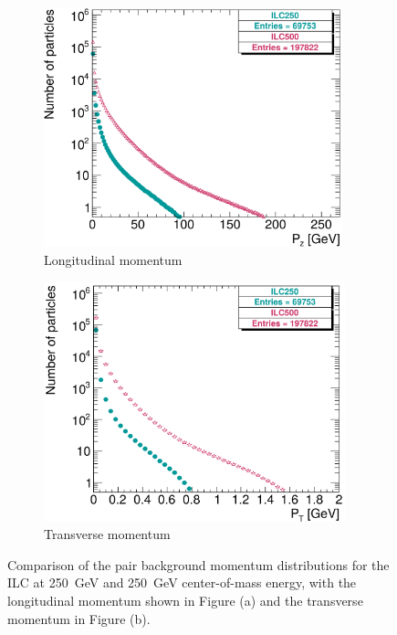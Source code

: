  \begin{figure}
 \centering
  \begin{subfigure}[b]{0.49\textwidth}
   \centering
    \includegraphics[width=0.95\textwidth]{Figures/Pairs/250_500_pairs_comparison_Pz.png}
   \caption{Longitudinal momentum}
   \end{subfigure}
   \hfill
    \begin{subfigure}[b]{0.49\textwidth}
   \centering
    \includegraphics[width=0.96\textwidth]{Figures/Pairs/250_500_pairs_comparison_PT.png}
   \caption{Transverse momentum}
   \end{subfigure}
   \caption[Pair background momentum distributions]{Comparison of the pair background momentum distributions for the ILC at \SI{250}{\GeV} and \SI{250}{\GeV} center-of-mass energy, with the longitudinal momentum shown in Figure (a) and the transverse momentum in Figure (b).}
   \label{fig:PairBkg:Momentum}
 \end{figure}
